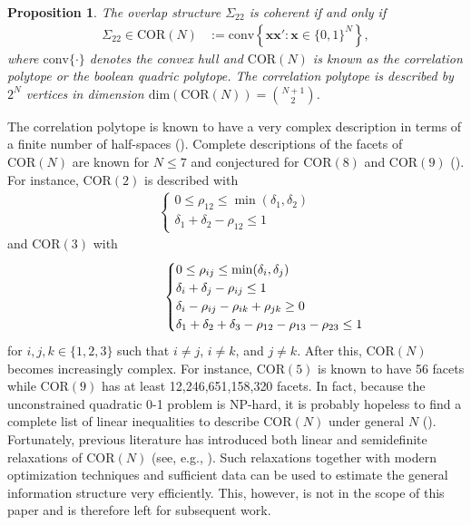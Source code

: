 \documentclass[11pt]{article}
\newcommand{\COR}{\text{COR}}
\newtheorem{proposition}[theorem]{Proposition}
\theoremstyle{definition}
\theoremstyle{definition}
\begin{document}
\begin{proposition}
\label{CorrelationPolytope}
The overlap structure $\Sigma_{22}$ is coherent if and only
if 
\begin{align*}
\Sigma_{22} \in \COR(N) &:= \text{conv}\left\{
\boldsymbol{x}\boldsymbol{x}' : \boldsymbol{x} \in
\{0,1\}^N\right\},
\end{align*}
where $\text{conv}\{\cdot\}$ denotes the convex hull and $\COR(N)$ is known as the correlation
polytope or the boolean quadric polytope. The correlation polytope is described by $2^N$
vertices in dimension $\text{dim}(\COR(N)) = \binom{N+1}{2}$.
\end{proposition}
The correlation polytope is known to have a very complex description in terms of a finite
number of half-spaces (\citealt{padberg1989boolean, ziegler2000lectures}). Complete descriptions of the facets of $\COR(N)$ are known for $N \leq 7$ and conjectured for  $\COR(8)$ and $\COR(9)$ (\citealt{ziegler2000lectures, christofsmapo, pitowsky1991correlation}). For instance, $\COR(2)$ is described with
\begin{align*}
\begin{cases}
 0 \leq \rho_{12} \leq \min(\delta_1, \delta_2)\\
 \delta_1 + \delta_2 - \rho_{12} \leq 1
\end{cases}
\end{align*}
and $\COR(3)$ with 
\begin{align*}
\hspace{5.5em}\begin{cases}
 0 \leq \rho_{ij} \leq \min(\delta_i, \delta_j)\\
 \delta_i + \delta_j - \rho_{ij} \leq 1\\
 \delta_i - \rho_{ij} - \rho_{ik} + \rho_{jk} \geq 0\\
 \delta_1 + \delta_2 + \delta_3 - \rho_{12} - \rho_{13} - \rho_{23} \leq 1
\end{cases}
\end{align*}
for $i,j,k \in \{1,2,3\}$ such that $i \neq j$, $i \neq k$, and $j \neq k$. After this, $\COR(N)$ becomes increasingly complex. For instance, $\COR(5)$ is known to have 56 facets while $\COR(9)$ has at least 12,246,651,158,320 facets. In fact, because the unconstrained quadratic
0-1 problem is NP-hard, it is probably hopeless to find a complete
list of linear inequalities to describe $\COR(N)$ under general $N$
(\citealt{deza1997geometry}). Fortunately, previous literature has introduced both linear and semidefinite relaxations of $\COR(N)$ (see, e.g., \citealt{laurent1997connections}). Such relaxations together with modern optimization techniques and sufficient data can be used to estimate the general information structure very efficiently. This, however, is not in the scope of this paper and is therefore left for subsequent work. 
\end{document}

